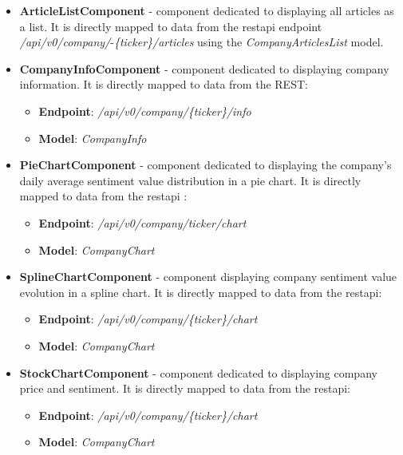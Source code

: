 \begin{itemize}
    \item \textbf{ArticleListComponent} - component dedicated to displaying all articles as a list. It is directly mapped to data from the \acrshort{restapi} endpoint \textit{/api/v0/company/}-\textit{\{ticker\}/articles} using the \textit{CompanyArticlesList} model.
    
    \item \textbf{CompanyInfoComponent} - component dedicated to displaying company information. It is directly mapped to data from the REST:
    \begin{itemize}
        \item \textbf{Endpoint}: \textit{/api/v0/company/\{ticker\}/info}  
        \item \textbf{Model}: \textit{CompanyInfo}
    \end{itemize}
    
    \item \textbf{PieChartComponent} - component dedicated to displaying the company's daily average sentiment value distribution in a pie chart. It is directly mapped to data from the \acrshort{restapi} :
    
    \begin{itemize}
        \item \textbf{Endpoint}: \textit{/api/v0/company/ticker/chart}  
        \item \textbf{Model}: \textit{CompanyChart}
    \end{itemize}
    
    \item \textbf{SplineChartComponent} - component displaying company sentiment value evolution in a spline chart. It is directly mapped to data from the \acrshort{restapi}:
    \begin{itemize}
        \item \textbf{Endpoint}: \textit{/api/v0/company/\{ticker\}/chart}  
        \item \textbf{Model}: \textit{CompanyChart}
    \end{itemize}

    \item \textbf{StockChartComponent} - component dedicated to displaying company price and sentiment. It is directly mapped to data from the \acrshort{restapi}:
    \begin{itemize}
        \item \textbf{Endpoint}: \textit{/api/v0/company/\{ticker\}/chart}  
        \item \textbf{Model}: \textit{CompanyChart}
    \end{itemize}
\end{itemize}

